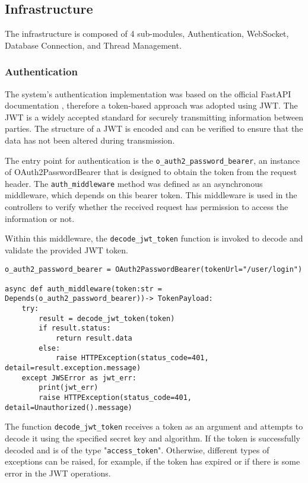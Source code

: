 \subsection{Infrastructure}\label{subsec:infra}

The infrastructure is composed of 4 sub-modules, Authentication, WebSocket, Database Connection, and Thread Management.

\subsubsection{Authentication}\label{subsubsec:auth}
The system's authentication implementation was based on the official FastAPI documentation \cite{fastapiSecurity}, therefore a token-based approach was adopted using \gls{JWT}. The \gls{JWT} is a widely accepted standard for securely transmitting information between parties. The structure of a \gls{JWT} is encoded and can be verified to ensure that the data has not been altered during transmission.

The entry point for authentication is the \texttt{o\_auth2\_password\_bearer}, an instance of OAuth2PasswordBearer that is designed to obtain the token from the request header. The \texttt{auth\_middleware} method was defined as an asynchronous middleware, which depends on this bearer token. This middleware is used in the controllers to verify whether the received request has permission to access the information or not.

Within this middleware, the \texttt{decode\_jwt\_token} function is invoked to decode and validate the provided \gls{JWT} token.

\begin{verbatim}
o_auth2_password_bearer = OAuth2PasswordBearer(tokenUrl="/user/login")

async def auth_middleware(token:str = Depends(o_auth2_password_bearer))-> TokenPayload:
    try:
        result = decode_jwt_token(token)
        if result.status:
            return result.data
        else:
            raise HTTPException(status_code=401, detail=result.exception.message)
    except JWSError as jwt_err:
        print(jwt_err)
        raise HTTPException(status_code=401, detail=Unauthorized().message)
\end{verbatim}

The function \texttt{decode\_jwt\_token} receives a token as an argument and attempts to decode it using the specified secret key and algorithm. If the token is successfully decoded and is of the type "\texttt{access\_token}". Otherwise, different types of exceptions can be raised, for example, if the token has expired or if there is some error in the \gls{JWT} operations.

